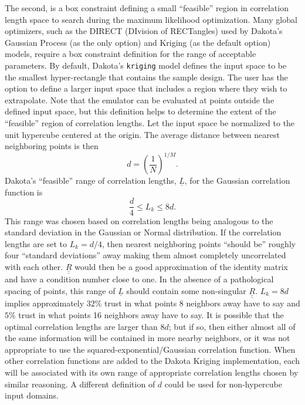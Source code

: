 The second, is a box constraint defining a small ``feasible'' region in
correlation length space to search during the maximum likelihood 
optimization.  Many global optimizers, such as the DIRECT (DIvision of 
RECTangles) used by Dakota's Gaussian Process (as the only option) and 
Kriging (as the default option) models, require a box constraint definition for
the range of acceptable parameters.  By default, Dakota's \texttt{kriging} 
model defines the input space to be the smallest hyper-rectangle that 
contains the sample design. The user has the option to define a larger 
input space that includes a region where they wish to extrapolate.  Note 
that the emulator can be evaluated at points outside the defined input 
space, but this definition helps to determine the extent of the 
``feasible'' region of correlation lengths.  Let the input space be 
normalized to the unit hypercube centered at the origin. The average 
distance between nearest neighboring points is then
\begin{displaymath}
d=\left(\frac{1}{N}\right)^{1/M}.
\end{displaymath}
Dakota's ``feasible'' range of correlation lengths, $\underline{L}$, for 
the Gaussian correlation function is
\begin{displaymath}
\frac{d}{4}\le L_k \le 8d.
\end{displaymath}
This range was chosen based on correlation lengths being analogous to 
the standard deviation in the Gaussian or Normal distribution.  If the 
correlation lengths are set to $L_k=d/4$, then nearest neighboring points 
``should be'' roughly four ``standard deviations'' away making them almost 
completely uncorrelated with each other. $\underline{\underline{R}}$ would 
then be a good approximation of the identity matrix and have a condition 
number close to one.  In the absence of a pathological spacing of points, 
this range of  $\underline{L}$ should contain some non-singular 
$\underline{\underline{R}}$.   $L_k=8d$ implies approximately  $32\%$ trust 
in what points 8 neighbors away have to say and $5\%$ trust in what points 
16 neighbors away have to say. It is possible that the optimal correlation 
lengths are larger than $8d$; but if so, then either almost all of the same 
information will be contained in more nearby neighbors, or it was not 
appropriate to use the squared-exponential/Gaussian correlation function.  
When other correlation functions are added to the Dakota Kriging 
implementation, each will be associated with its own range of appropriate 
correlation lengths chosen by similar reasoning.  A different definition of 
$d$ could be used for non-hypercube input domains.

